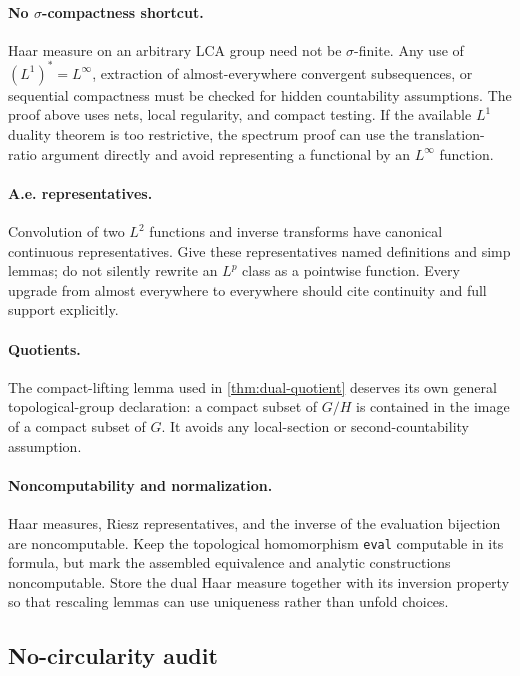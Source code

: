 \documentclass[11pt]{article}
\theoremstyle{definition}
\theoremstyle{remark}
\newcommand{\Lp}[1]{L^{#1}}
\begin{document}
\paragraph{No $\sigma$-compactness shortcut.}
Haar measure on an arbitrary LCA group need not be $\sigma$-finite.  Any use of
$(\Lp1)^*=\Lp\infty$, extraction of almost-everywhere convergent subsequences, or
sequential compactness must be checked for hidden countability assumptions.  The proof
above uses nets, local regularity, and compact testing.  If the available $\Lp1$ duality
theorem is too restrictive, the spectrum proof can use the translation-ratio argument
directly and avoid representing a functional by an $\Lp\infty$ function.

\paragraph{A.e. representatives.}
Convolution of two $\Lp2$ functions and inverse transforms have canonical continuous
representatives.  Give these representatives named definitions and simp lemmas; do not
silently rewrite an $\Lp p$ class as a pointwise function.  Every upgrade from almost
everywhere to everywhere should cite continuity and full support explicitly.

\paragraph{Quotients.}
The compact-lifting lemma used in \cref{thm:dual-quotient} deserves its own general
topological-group declaration: a compact subset of $G/H$ is contained in the image of a
compact subset of $G$.  It avoids any local-section or second-countability assumption.

\paragraph{Noncomputability and normalization.}
Haar measures, Riesz representatives, and the inverse of the evaluation bijection are
noncomputable.  Keep the topological homomorphism \texttt{eval} computable in its formula,
but mark the assembled equivalence and analytic constructions noncomputable.  Store the
dual Haar measure together with its inversion property so that rescaling lemmas can use
uniqueness rather than unfold choices.

\subsection{No-circularity audit}
\end{document}
